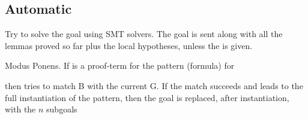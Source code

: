 
\subsection{Automatic}

Try to solve the goal using SMT solvers. The goal is sent along with all the
 lemmas proved so far plus the local hypotheses, unless the  is
 given.
 
 \noindent

Modus Ponens. If  is a proof-term for the pattern (formula) for
  \begin{center}
  \end{center}
  \noindent then \tacname{} tries to match B with the current G. If the
  match succeeds and leads to the full instantiation of the pattern,
  then the goal is replaced, after instantiation, with the $n$ subgoals

